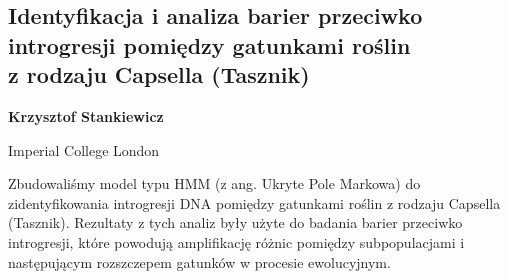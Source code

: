 \documentclass[\main/boa.tex]{subfiles}
\begin{document}
\subsection[Identyfikacja i analiza barier przeciwko introgresji pomiędzy gatunkami roślin z rodzaju Capsella (Tasznik)]{Identyfikacja i analiza barier przeciwko introgresji pomiędzy gatunkami roślin \\ z rodzaju Capsella (Tasznik)}

\begin{minipage}{0.915\textwidth}
	\centering
  {\bf {} Krzysztof Stankiewicz}
\end{minipage}

\begin{affiliations}
\begin{minipage}{0.915\textwidth}
\centering
Imperial College London \\[-2pt]
\end{minipage}
\end{affiliations}

\vskip 0.3cm
Zbudowaliśmy model typu HMM (z ang. Ukryte Pole Markowa) do zidentyfikowania introgresji DNA pomiędzy gatunkami roślin z rodzaju Capsella (Tasznik). Rezultaty z tych analiz były użyte do badania barier przeciwko introgresji, które powodują amplifikację różnic pomiędzy subpopulacjami i następującym rozszczepem gatunków w procesie ewolucyjnym.
\end{document}
